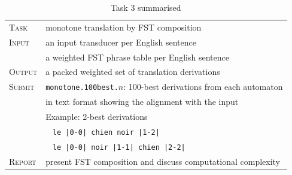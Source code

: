 \begin{table}[h]\centering
\begin{tabular}{l p{12cm}}
\textsc{Task}   &  monotone translation by FST composition \\
\textsc{Input}  &  an input transducer per English sentence \\
                &  a weighted FST phrase table per English sentence\\
\textsc{Output} &  a packed weighted set of translation derivations \\
\textsc{Submit} &  \texttt{monotone.100best.}$n$: 100-best derivations from each automaton \\
                &  in text format showing the alignment with the input\\
                &  Example: 2-best derivations \\
                & ~ \texttt{le |0-0| chien noir |1-2|} \\
                & ~ \texttt{le |0-0| noir |1-1| chien |2-2|} \\
\textsc{Report} & present FST composition and discuss computational complexity \\                
\end{tabular}
\caption{\label{tab:task3}Task 3 summarised}
\end{table}

